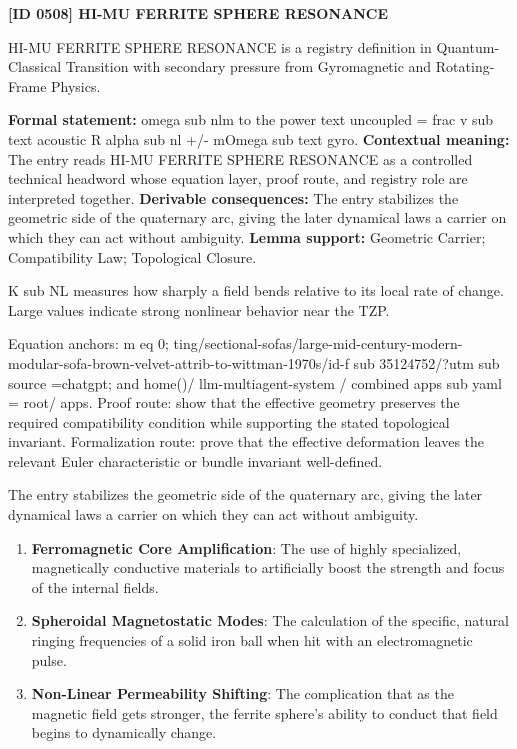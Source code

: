 \clearpage
\noindent\textbf{[ID 0508] HI-MU FERRITE SPHERE RESONANCE}\par
\vspace{0.35em}
\begingroup\small
{}
HI-MU FERRITE SPHERE RESONANCE is a registry definition in Quantum-Classical Transition with secondary pressure from Gyromagnetic and Rotating-Frame Physics.

\begingroup\footnotesize\setlength{\emergencystretch}{3em}\sloppy
\textbf{Formal statement:} omega sub nlm to the power text uncoupled = frac v sub text acoustic R alpha sub nl +/- mOmega sub text gyro. \textbf{Contextual meaning:} The entry reads HI-MU FERRITE SPHERE RESONANCE as a controlled technical headword whose equation layer, proof route, and registry role are interpreted together. \textbf{Derivable consequences:} The entry stabilizes the geometric side of the quaternary arc, giving the later dynamical laws a carrier on which they can act without ambiguity. \textbf{Lemma support:} Geometric Carrier; Compatibility Law; Topological Closure.\par
\endgroup

K sub NL measures how sharply a field bends relative to its local rate of change. Large values indicate strong nonlinear behavior near the TZP.

Equation anchors: m eq 0; ting/sectional-sofas/large-mid-century-modern-modular-sofa-brown-velvet-attrib-to-wittman-1970s/id-f sub 35124752/?utm sub source =chatgpt; and home()/ llm-multiagent-system / combined apps sub yaml = root/ apps. Proof route: show that the effective geometry preserves the required compatibility condition while supporting the stated topological invariant. Formalization route: prove that the effective deformation leaves the relevant Euler characteristic or bundle invariant well-defined.

The entry stabilizes the geometric side of the quaternary arc, giving the later dynamical laws a carrier on which they can act without ambiguity.
\endgroup

\begin{enumerate}[leftmargin=1.6em,itemsep=6pt,topsep=4pt]
\item \textbf{Ferromagnetic Core Amplification}: The use of highly specialized, magnetically conductive materials to artificially boost the strength and focus of the internal fields.
\item \textbf{Spheroidal Magnetostatic Modes}: The calculation of the specific, natural ringing frequencies of a solid iron ball when hit with an electromagnetic pulse.
\item \textbf{Non-Linear Permeability Shifting}: The complication that as the magnetic field gets stronger, the ferrite sphere's ability to conduct that field begins to dynamically change.
\end{enumerate}

